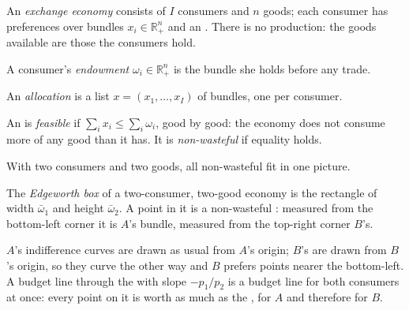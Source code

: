 \begin{definition}\label{def:b2:exchange-economies:exchange-economy}
An \emph{exchange economy} consists of $I$ consumers and $n$ goods; each
consumer has preferences over bundles $x_i \in \mathbb{R}^n_{+}$ and an . There is no
production: the goods available are those the consumers hold.
\end{definition}

\begin{definition}[Endowment]\label{def:b2:exchange-economies:endowment}
A consumer's \emph{endowment} $\omega_i \in \mathbb{R}^n_{+}$ is the bundle she holds
before any trade.
\end{definition}

\begin{definition}[Allocation]\label{def:b2:exchange-economies:allocation}
An \emph{allocation} is a list $x = (x_1, \dots, x_I)$ of bundles, one per consumer.
\end{definition}

\begin{definition}\label{def:b2:exchange-economies:feasible}
An  is \emph{feasible} if $\sum_i x_i \le \sum_i \omega_i$, good by
good: the economy does not consume more of any good than it has. It is \emph{non-wasteful} if equality
holds.
\end{definition}

With two consumers and two goods, all non-wasteful  fit in one picture.

\begin{definition}\label{def:b2:exchange-economies:edgeworth-box}
The \emph{Edgeworth box} of a two-consumer, two-good economy is the rectangle of
width $\bar\omega_1$ and height $\bar\omega_2$. A point in it is a non-wasteful : measured from
the bottom-left corner it is $A$'s bundle, measured from the top-right corner $B$'s.
\end{definition}

$A$'s indifference curves are drawn as usual from $A$'s origin; $B$'s are drawn from $B$'s origin, so
they curve the other way and $B$ prefers points nearer the bottom-left. A budget line through the
 with slope $-p_1/p_2$ is a budget line for both consumers at once: every point on it is worth
as much as the , for $A$ and therefore for $B$.

